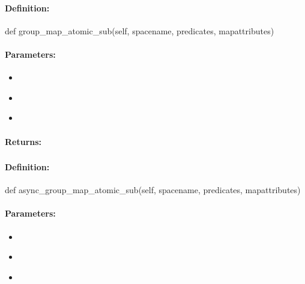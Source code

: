 \paragraph{Definition:}
\begin{pythoncode}
def group_map_atomic_sub(self, spacename, predicates, mapattributes)
\end{pythoncode}

\paragraph{Parameters:}
\begin{itemize}[noitemsep]
\item {}\\

\item {}\\

\item {}\\

\end{itemize}

\paragraph{Returns:}


\pagebreak
\subsubsection{}
\label{api:python:async_group_map_atomic_sub}


\paragraph{Definition:}
\begin{pythoncode}
def async_group_map_atomic_sub(self, spacename, predicates, mapattributes)
\end{pythoncode}

\paragraph{Parameters:}
\begin{itemize}[noitemsep]
\item {}\\

\item {}\\

\item {}\\

\end{itemize}

